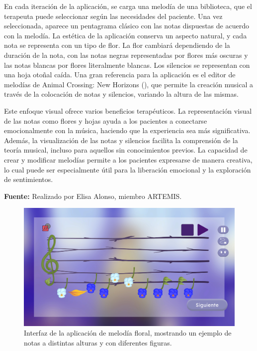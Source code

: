 En cada iteración de la aplicación, se carga una melodía de una biblioteca, que el terapeuta puede seleccionar según las necesidades del paciente. Una vez seleccionada, aparece un pentagrama clásico con las notas dispuestas de acuerdo con la melodía. La estética de la aplicación conserva un aspecto natural, y cada nota se representa con un tipo de flor. La flor cambiará dependiendo de la duración de la nota, con las notas negras representadas por flores más oscuras y las notas blancas por flores literalmente blancas. Los silencios se representan con una hoja otoñal caída. Una gran referencia para la aplicación es el editor de melodías de Animal Crossing: New Horizons (\cite{ACNH:2020}), que permite la creación musical a través de la colocación de notas y silencios, variando la altura de las mismas. 

Este enfoque visual ofrece varios beneficios terapéuticos. La representación visual de las notas como flores y hojas ayuda a los pacientes a conectarse emocionalmente con la música, haciendo que la experiencia sea más significativa. Además, la visualización de las notas y silencios facilita la comprensión de la teoría musical, incluso para aquellos sin conocimientos previos. La capacidad de crear y modificar melodías permite a los pacientes expresarse de manera creativa, lo cual puede ser especialmente útil para la liberación emocional y la exploración de sentimientos.

\begin{center}
	\textbf{Fuente:} Realizado por Elisa Alonso, miembro ARTEMIS.
	\vspace{-18pt}
\end{center}

\begin{figure}[h!]
	\centering
	\includegraphics[width=0.8\linewidth]{Figuras/Desarrollo/MelodiaFloralGame.png}
	\caption[Interfaz de la aplicación melodía floral.]{Interfaz de la aplicación de melodía floral, mostrando un ejemplo de notas a distintas alturas y con diferentes figuras.}
	\label{fig:FloralMelodyGame}
\end{figure}


